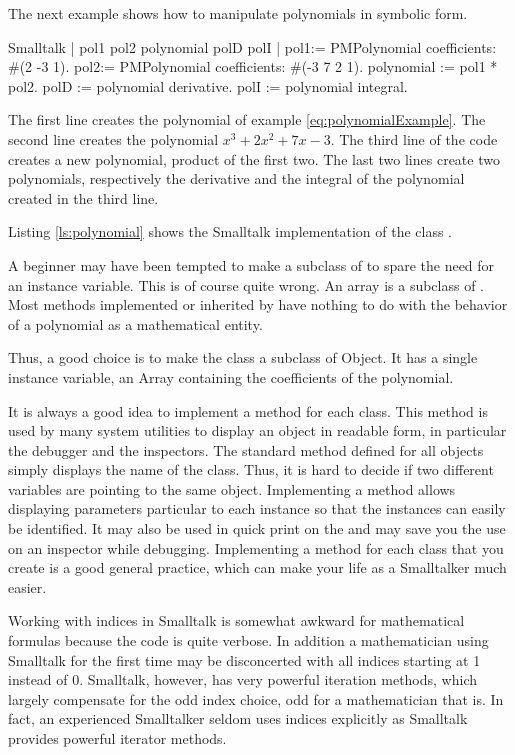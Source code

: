 The next example shows how to manipulate polynomials in symbolic form.
\begin{listing}{Smalltalk}
{ }
| pol1 pol2 polynomial polD polI |
pol1:= PMPolynomial coefficients: #(2 -3 1).
pol2:= PMPolynomial coefficients: #(-3 7 2 1).
polynomial := pol1 * pol2.
polD := polynomial derivative.
polI := polynomial integral.
\end{listing}
The first line creates the  polynomial of example
\ref{eq:polynomialExample}. The second line creates the polynomial
$x^3+2x^2+7x-3$. The third line of the code creates a new
polynomial, product of the first two. The last two lines create
two polynomials, respectively the derivative and the integral of
the polynomial created in the third line.

Listing \ref{ls:polynomial} shows the Smalltalk implementation of
the class .

A beginner may have been tempted to make  a
subclass of  to spare the need for an instance
variable. This is of course quite wrong. An array is a subclass of
.
Most methods implemented or inherited by  have nothing to do with the behavior of a polynomial as a mathematical entity.

Thus, a good choice is to make the class  a
subclass of Object. It has a single instance variable, an Array
containing the coefficients of the polynomial.

It is always a good idea to implement a method  for
each class. This method is used by many system utilities to
display an object in readable form, in particular the debugger and
the inspectors. The standard method defined for all objects simply
displays the name of the class. Thus, it is hard to decide if two
different variables are pointing to the same object. Implementing
a method  allows displaying parameters particular to
each instance so that the instances can easily be identified. It
may also be used in quick print on the  and may
save you the use on an inspector while debugging. Implementing a
method  for each class that you create is a good
general practice, which can make your life as a Smalltalker much
easier.

Working with indices in Smalltalk is somewhat awkward for
mathematical formulas because the code is quite verbose. In
addition a mathematician using Smalltalk for the first time may be
disconcerted with all indices starting at 1 instead of 0.
Smalltalk, however, has very powerful iteration methods, which
largely compensate for the odd index choice, odd for a
mathematician that is. In fact, an experienced Smalltalker seldom
uses indices explicitly as Smalltalk provides powerful iterator
methods.

